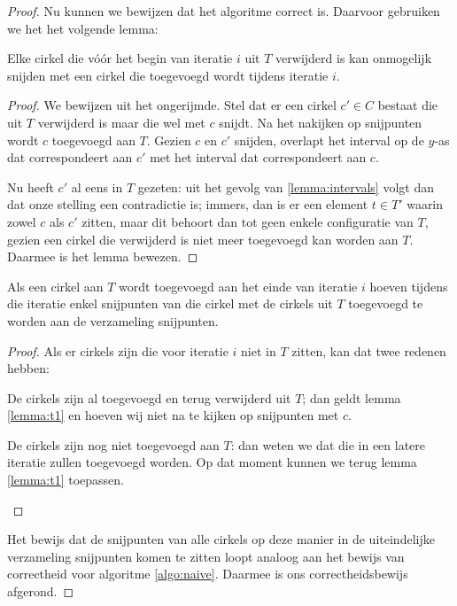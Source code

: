 \begin{proof}
Nu kunnen we bewijzen dat het algoritme correct is. Daarvoor gebruiken
we het het volgende lemma:

\begin{lemma}
Elke cirkel die v\'o\'or het begin van iteratie $i$ uit $T$ verwijderd is
kan onmogelijk snijden met een cirkel die toegevoegd wordt tijdens
iteratie $i$.
\label{lemma:t1}
\end{lemma}

\begin{proof}
We bewijzen uit het ongerijmde. Stel dat er een cirkel $c' \in C$
bestaat die uit $T$ verwijderd is maar die wel met $c$ snijdt. Na het
nakijken op snijpunten wordt $c$ toegevoegd aan $T$. Gezien $c$ en
$c'$ snijden, overlapt het interval op de $y$-as dat correspondeert
aan $c'$ met het interval dat correspondeert aan $c$.

Nu heeft $c'$ al eens in $T$ gezeten: uit het gevolg van
\ref{lemma:intervals} volgt dan dat onze stelling een contradictie is;
immers, dan is er een element $t \in T'$ waarin zowel $c$ als $c'$
zitten, maar dit behoort dan tot geen enkele configuratie van $T$,
gezien een cirkel die verwijderd is niet meer toegevoegd kan worden
aan $T$. Daarmee is het lemma bewezen.
\end{proof}

\begin{gevolg} 
Als een cirkel aan $T$ wordt toegevoegd aan het einde van iteratie $i$
hoeven tijdens die iteratie enkel snijpunten van die cirkel met de
cirkels uit $T$ toegevoegd te worden aan de verzameling snijpunten.
\end{gevolg} 
\begin{proof}
Als er cirkels zijn die voor iteratie $i$ niet in $T$ zitten, kan dat
twee redenen hebben:
\begin{geval}
De cirkels zijn al toegevoegd en terug verwijderd uit $T$; dan geldt
lemma \ref{lemma:t1} en hoeven wij niet na te kijken op snijpunten met
$c$.
\end{geval}
\begin{geval}
De cirkels zijn nog niet toegevoegd aan $T$: dan weten we dat die in
een latere iteratie zullen toegevoegd worden. Op dat moment kunnen
we terug lemma \ref{lemma:t1} toepassen.
\end{geval}
\end{proof}

Het bewijs dat de snijpunten van alle cirkels op deze manier in de
uiteindelijke verzameling snijpunten komen te zitten loopt analoog aan
het bewijs van correctheid voor algoritme \ref{algo:naive}. Daarmee is
ons correctheidsbewijs afgerond.
\end{proof}
